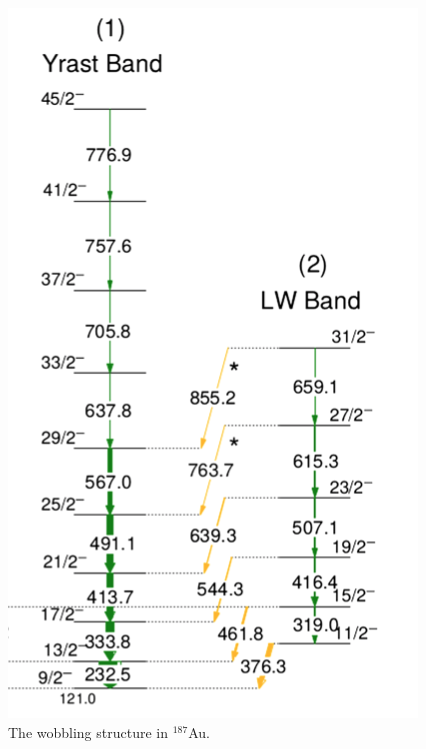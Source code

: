 \documentclass[12pt, a4paper]{article}
\begin{document}
\begin{figure}[ht]
    \centering
    \includegraphics[scale=0.3]{figs/spectrum_Au187.png}
    \caption{The wobbling structure in $^{187}$Au.}
    \label{au_187_bands}
\end{figure}

\newpage


\end{document}
